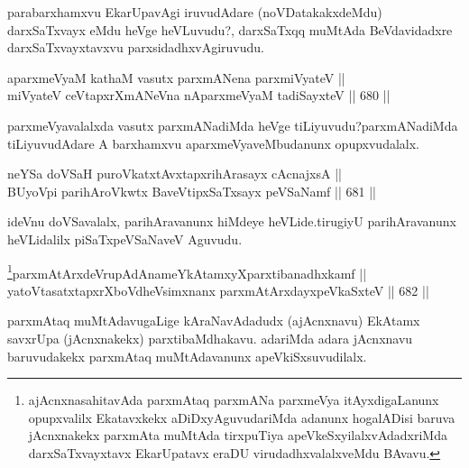 \begin{artha} 
parabarxhamxvu EkarUpavAgi iruvudAdare (noVDatakakxdeMdu) darxSaTxvayx eMdu heVge heVLuvudu?, darxSaTxqq muMtAda BeVdavidadxre darxSaTxvayxtavxvu parxsidadhxvAgiruvudu.
\end{artha}


\begin{shl}
aparxmeVyaM kathaM vasutx parxmANena parxmiVyateV || \\
miVyateV ceVtapxrXmANeVna nAparxmeVyaM tadiSayxteV \hfill || 680 ||  
\end{shl}

\begin{artha} 
parxmeVyavalalxda vasutx parxmANadiMda heVge tiLiyuvudu?\break parxmANadiMda 
tiLiyuvudAdare A barxhamxvu aparxmeVyaveMbudanunx opupxvudalalx.
\end{artha}


\begin{shl}
neYSa doVSaH puroVkatxtAvxtapxrihArasayx cAcnajxsA || \\
BUyoV\s pi parihAroVkwtx BaveVtipxSaTxsayx peVSaNamf \hfill || 681 ||  
\end{shl}

\begin{artha} 
ideVnu doVSavalalx, parihAravanunx hiMdeye heVLide.\break tirugiyU 
parihAravanunx heVLidalilx piSaTxpeVSaNaveV Aguvudu.
\end{artha}


\begin{shl}
\footnote{ajAcnxnasahitavAda parxmAtaq parxmANa parxmeVya itAyxdigaLanunx opupxvalilx Ekatavxkekx aDiDxyAguvudariMda adanunx hogalADisi baruva jAcnxnakekx parxmAta muMtAda tirxpuTiya apeVkeSxyilalxvAdadxriMda darxSaTxvayxtavx EkarUpatavx eraDU virudadhxvalalxveMdu BAvavu.}parxmAtArxdeVrupAdAnameYkAtamxyXparxtibanadhxkamf || \\
yatoV\s tasatxtapxrXboVdheV\s simxnanx parxmAtArxdayxpeVkaSxteV \hfill || 682 ||  
\end{shl}

\begin{artha} 
parxmAtaq muMtAdavugaLige kAraNavAdadudx (ajAcnxnavu) EkAtamx savxrUpa (jAcnxnakekx) parxtibaMdhakavu. adariMda adara jAcnxnavu baruvudakekx parxmAtaq muMtAdavanunx apeVkiSxsuvudilalx.
\end{artha}

